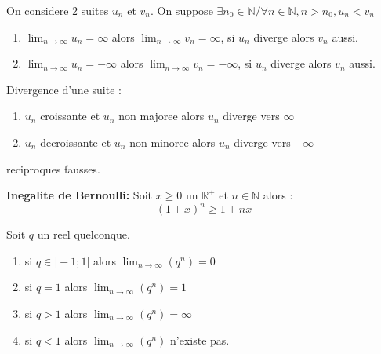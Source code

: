 \documentclass[a4paper,10pt]{book}
\begin{document}
	\newpage

	\begin{prop}
		On considere 2 suites $u_n$ et $v_n$. On suppose $\exists n_0 \in \mathbb{N} / \forall n \in \mathbb{N}, n > n_0, u_n < v_n$
		\begin{enumerate}
			\item $\lim_{n \rightarrow \infty}u_n = \infty$ alors $\lim_{n \rightarrow \infty}v_n = \infty$, si $u_n$ diverge alors $v_n$ aussi.
			\item $\lim_{n \rightarrow \infty}u_n = - \infty$ alors $\lim_{n \rightarrow \infty}v_n = - \infty$, si $u_n$ diverge alors $v_n$ aussi.
		\end{enumerate}
	\end{prop}

	\begin{prop} Divergence d'une suite :\\
		\begin{enumerate}
			\item $u_n$ croissante et $u_n$ non majoree alors $u_n$ diverge vers $\infty$
			\item $u_n$ decroissante et $u_n$ non minoree alors $u_n$ diverge vers $-\infty$
		\end{enumerate}
		reciproques fausses.
	\end{prop}

	\begin{prop} \textbf{Inegalite de Bernoulli:}
		Soit $x \geq 0$ un $\mathbb{R}^+$ et $n \in \mathbb{N}$ alors :
		\begin{equation}
			(1+x)^n \geq 1 + nx
		\end{equation}
	\end{prop}

	\begin{prop}
		Soit $q$ un reel quelconque.
		\begin{enumerate}
			\item si $q \in ]-1;1[$ alors $\lim_{n \rightarrow \infty}(q^n) = 0$
			\item si $q = 1$ alors $\lim_{n \rightarrow \infty}(q^n) = 1$
			\item si $q > 1$ alors $\lim_{n \rightarrow \infty}(q^n) = \infty$
			\item si $q < 1$ alors $\lim_{n \rightarrow \infty}(q^n)$ n'existe pas.
		\end{enumerate}
	\end{prop}
\end{document}
